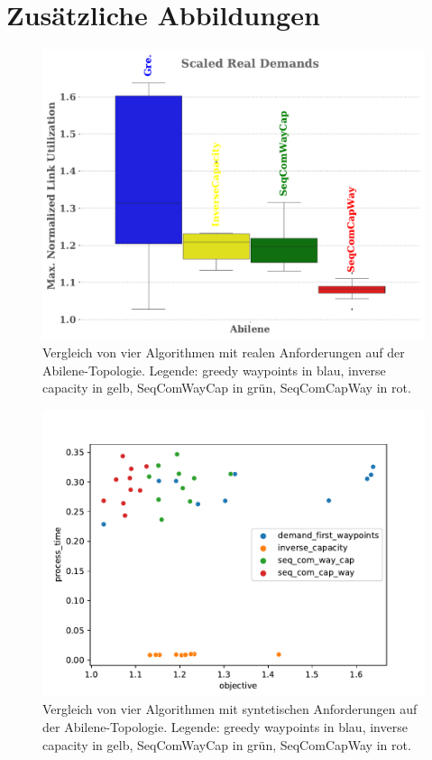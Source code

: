 \documentclass[sigconf, nonacm, review]{acmart}
\begin{document}
\section{Zus\"atzliche Abbildungen}
\begin{figure}
\centering
\includegraphics[width=\linewidth]{figures/pouria_real_demands.pdf}
\caption{Vergleich von vier Algorithmen mit realen Anforderungen auf der Abilene-Topologie. Legende: greedy waypoints in blau, inverse capacity in gelb, SeqComWayCap in gr\"un, SeqComCapWay in rot.}
\label{fig:pouriaBoxplotReal}
\end{figure}
\begin{figure}
\centering
\includegraphics[width=\linewidth]{figures/pouria_colored_scatter_plot_results_real_demands.pdf}
\caption{Vergleich von vier Algorithmen mit syntetischen Anforderungen auf der Abilene-Topologie. Legende: greedy waypoints in blau, inverse capacity in gelb, SeqComWayCap in gr\"un, SeqComCapWay in rot.}
\label{fig:pouriaScatterReal}
\end{figure}
\end{document}
